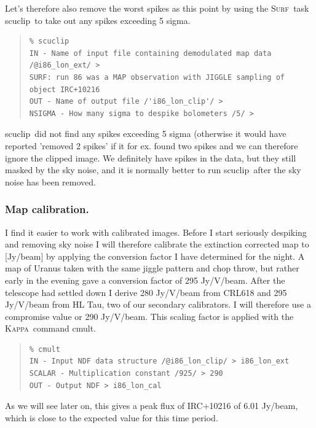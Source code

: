 \documentclass[twoside,11pt]{article}
\newenvironment{myquote}{\begin{quote}\begin{small}}{\end{small}\end{quote}}
\newcommand{\Kappa}{\xref{\textsc{Kappa}}{sun95}{}}
\newcommand{\surf}{\xref{\textsc{Surf}}{sun216}{}}
\newcommand{\task}[1]{\textsf{#1}}
\newcommand{\scuclip}{\xref{\task{scuclip}}{sun216}{SCUCLIP}}
\newcommand{\cmult}{\xref{\task{cmult}}{sun95}{CMULT}}
\newcommand{\xref}[3]{#1}
\newcommand{\xlabel}[1]{}
\renewcommand{\_}{\texttt{\symbol{95}}}
\begin{document}
Let's therefore also remove the worst spikes as this point by using the \surf\
task \scuclip\ to take out any spikes exceeding 5 sigma.

\begin{myquote}
\begin{verbatim}
% scuclip
IN - Name of input file containing demodulated map data /@i86_lon_ext/ > 
SURF: run 86 was a MAP observation with JIGGLE sampling of object IRC+10216
OUT - Name of output file /'i86_lon_clip'/ > 
NSIGMA - How many sigma to despike bolometers /5/ > 
\end{verbatim}
\end{myquote}

\scuclip\ did not find any spikes exceeding 5 sigma (otherwise it would
have reported  'removed 2 spikes' if it for ex. found two spikes and we
can therefore ignore the clipped image. We definitely have spikes in the data,
but they still masked by the sky noise, and it is normally better to run \scuclip\ after the sky noise has been removed.


\subsubsection{\xlabel{Map\_calibration}Map calibration.}



I find it easier to work with calibrated images. Before I start
seriously despiking and removing sky noise I will therefore calibrate
the extinction corrected map to [Jy/beam] by applying the conversion
factor I have determined for the night. A map of Uranus taken with the
same jiggle pattern and chop throw, but rather early in the evening
gave a conversion factor of  295 Jy/V/beam. After the telescope had
settled down I derive 280 Jy/V/beam from CRL618 and 295 Jy/V/beam from
HL Tau, two of our secondary calibrators. I will therefore use a
compromise value or 290 Jy/V/beam. This scaling factor is applied with
the \Kappa\ command \cmult.

\begin{myquote}
\begin{verbatim}
% cmult
IN - Input NDF data structure /@i86_lon_clip/ > i86_lon_ext
SCALAR - Multiplication constant /925/ > 290
OUT - Output NDF > i86_lon_cal
\end{verbatim}
\end{myquote}

As we will see later on, this gives a peak flux of IRC+10216 of 6.01 Jy/beam, which is close to the expected value for this time period.
\end{document}

